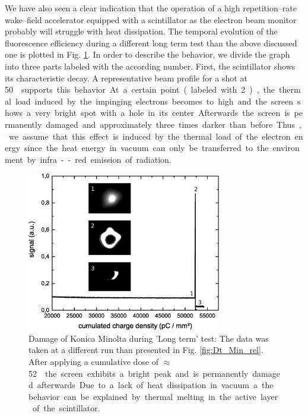 \documentclass[%
preprint,
amsmath,
amssymb,
aip,
rsi, 
numerical,
floatfix,
]{revtex4-1}
\begin{document}
We have also seen a clear indication that the operation of a high repetition--rate wake--field accelerator equipped with a scintillator as the electron beam monitor probably will struggle with heat dissipation.
The temporal evolution of the fluorescence efficiency during a different long term test than the above discussed one is plotted in Fig. \ref{fig:Damage}.
In order to describe the behavior, we divide the graph into three parts labeled with the according number. 
First, the scintillator shows its characteristic decay. 
A representative beam profile for a shot at \SI[per-mode=symbol]{50}{\nano\coulomb \per \milli\meter\square}  supports this behavior.
At a certain point (labeled with 2), the thermal load induced by the impinging electrons becomes to high and the screen shows a very bright spot with a hole in its center.
Afterwards the screen is permanently damaged and approximately three times darker than before.
Thus, we assume that this effect is induced by the thermal load of the electron energy since the heat energy in vacuum can only be transferred to the environment by infra--red emission of radiation.

\begin{figure}
\includegraphics[width=8.5cm]{./Figures/Damage}%
\caption{\label{fig:Damage} Damage of Konica Minolta during 'Long term' test: 
The data was taken at a different run than presented in Fig. \ref{fig:Dt_Min_rel}. 
After applying a cumulative dose of $\approx$ \SI[per-mode=symbol]{52}{\nano\coulomb \per \milli\meter\square} the screen exhibits a bright peak and is permanently damaged afterwards. 
Due to a lack of heat dissipation in vacuum a the behavior can be explained by thermal melting in the active layer of the scintillator.}
\end{figure}
\end{document}
